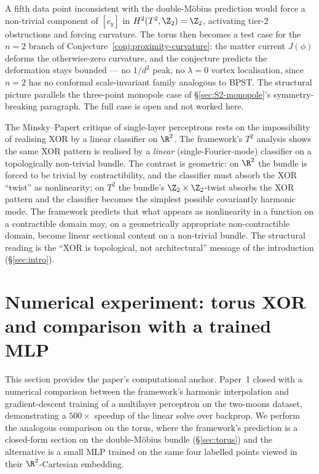 \begin{remark}
\label{rem:T2-secondary}
A fifth data point inconsistent with the double-M\"obius prediction
would force a non-trivial component of $[c_y]$ in
$H^2(T^2,\Z_2)=\Z_2$, activating tier-2 obstructions and forcing
curvature. The torus then becomes a test case for the $n=2$ branch
of Conjecture~\ref{conj:proximity-curvature}: the matter current
$J(\phi)$ deforms the otherwise-zero curvature, and the conjecture
predicts the deformation stays bounded ---  no $1/d^2$ peak, no
$\lambda=0$ vortex localisation, since $n=2$ has no conformal
scale-invariant family analogous to BPST. The structural picture
parallels the three-point monopole case of
\S\ref{sec:S2-monopole}'s symmetry-breaking paragraph. The full
case is open and not worked here.
\end{remark}

\begin{remark}
\label{rem:xor-architectural}
The Minsky--Papert critique of single-layer perceptrons rests on
the impossibility of realising XOR by a linear classifier on
$\R^2$. The framework's $T^2$ analysis shows the same XOR pattern
is realised by a \emph{linear} (single-Fourier-mode) classifier on
a topologically non-trivial bundle. The contrast is geometric: on
$\R^2$ the bundle is forced to be trivial by contractibility, and
the classifier must absorb the XOR ``twist'' as nonlinearity; on
$T^2$ the bundle's $\Z_2\times\Z_2$-twist absorbs the XOR pattern
and the classifier becomes the simplest possible covariantly
harmonic mode. The framework predicts that what appears as
nonlinearity in a function on a contractible domain may, on a
geometrically appropriate non-contractible domain, become linear
sectional content on a non-trivial bundle. The structural reading
is the ``XOR is topological, not architectural'' message of the
introduction (\S\ref{sec:intro}).
\end{remark}


\section{Numerical experiment: torus XOR and comparison with a trained MLP}
\label{sec:numerical-torus}

This section provides the paper's computational anchor. Paper~1
\cite[\S 14]{Vasii2026Paper1} closed with a numerical comparison
between the framework's harmonic interpolation and gradient-descent
training of a multilayer perceptron on the two-moons dataset,
demonstrating a $500\times$ speedup of the linear solve over backprop.
We perform the analogous comparison on the torus, where the
framework's prediction is a closed-form section on the
double-M\"obius bundle (\S\ref{sec:torus}) and the alternative is a
small MLP trained on the same four labelled points viewed in their
$\R^2$-Cartesian embedding.

